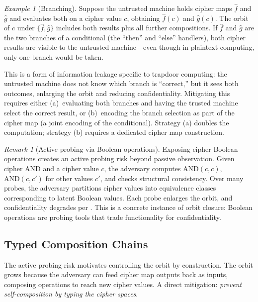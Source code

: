 \documentclass[11pt]{article}
\theoremstyle{definition}
\theoremstyle{plain}
\theoremstyle{remark}
\newtheorem{remark}{Remark}[section]
\newtheorem{example}{Example}[section]
\newcommand{\fhat}{\hat{f}}
\begin{document}
\begin{example}[Branching]
\label{ex:branching-orbit}
Suppose the untrusted machine holds cipher maps $\fhat$ and $\hat{g}$
and evaluates both on a cipher value $c$, obtaining $\fhat(c)$ and
$\hat{g}(c)$.
The orbit of $c$ under $\{\fhat, \hat{g}\}$ includes both results plus all
further compositions.
If $\fhat$ and $\hat{g}$ are the two branches of a conditional
(the ``then'' and ``else'' handlers), both cipher results are visible to
the untrusted machine---even though in plaintext computing, only one
branch would be taken.

This is a form of information leakage specific to trapdoor computing:
the untrusted machine does not know which branch is ``correct,'' but it
sees both outcomes, enlarging the orbit and reducing confidentiality.
Mitigating this requires either (a)~evaluating both branches and having the
trusted machine select the correct result, or (b)~encoding the branch
selection as part of the cipher map (a joint encoding of the conditional).
Strategy (a) doubles the computation; strategy (b) requires a dedicated
cipher map construction.
\end{example}


\begin{remark}[Active probing via Boolean operations]
\label{rem:active-probing}
Exposing cipher Boolean operations creates an active probing risk
beyond passive observation.
Given cipher AND and a cipher value $c$, the adversary computes
$\mathrm{AND}(c, c)$, $\mathrm{AND}(c, c')$ for other values $c'$,
and checks structural consistency.
Over many probes, the adversary partitions cipher values into
equivalence classes corresponding to latent Boolean values.
Each probe enlarges the orbit, and confidentiality degrades per
.
This is a concrete instance of orbit closure: Boolean operations are
probing tools that trade functionality for confidentiality.
\end{remark}

\subsection{Typed Composition Chains}
\label{sec:typed-chains}

The active probing risk motivates controlling the orbit by
construction.
The orbit grows because the adversary can feed cipher map outputs back
as inputs, composing operations to reach new cipher values.
A direct mitigation: \emph{prevent self-composition by typing the
cipher spaces}.
\end{document}
